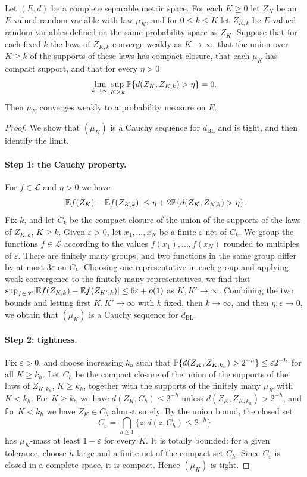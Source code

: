 \begin{lemma}\label{ch25:lem:probability-approximation}
Let $(E,d)$ be a complete separable metric space. For each $K\ge0$ let $Z_K$ be an $E$-valued random variable with law $\mu_K$, and for $0\le k\le K$ let $Z_{K,k}$ be $E$-valued random variables defined on the same probability space as $Z_K$. Suppose that for each fixed $k$ the laws of $Z_{K,k}$ converge weakly as $K\to\infty$, that the union over $K\ge k$ of the supports of these laws has compact closure, that each $\mu_K$ has compact support, and that for every $\eta>0$
\[
 \lim_{k\to\infty}\sup_{K\ge k}\mathbb P\{d(Z_K,Z_{K,k})>\eta\}=0.
\]
Then $\mu_K$ converges weakly to a probability measure on $E$.
\end{lemma}

\begin{proof}
We show that $(\mu_K)$ is a Cauchy sequence for $d_{\mathrm{BL}}$ and is tight, and then identify the limit.

\paragraph{Step 1: the Cauchy property.}
For $f\in\mathscr L$ and $\eta>0$ we have
\[
 \lvert \mathbb E f(Z_K)-\mathbb E f(Z_{K,k})\rvert\le\eta+2\mathbb P\{d(Z_K,Z_{K,k})>\eta\}.
\]
Fix $k$, and let $C_k$ be the compact closure of the union of the supports of the laws of $Z_{K,k}$, $K\ge k$. Given $\varepsilon>0$, let $x_1,\ldots,x_N$ be a finite $\varepsilon$-net of $C_k$. We group the functions $f\in\mathscr L$ according to the values $f(x_1),\ldots,f(x_N)$ rounded to multiples of $\varepsilon$. There are finitely many groups, and two functions in the same group differ by at most $3\varepsilon$ on $C_k$. Choosing one representative in each group and applying weak convergence to the finitely many representatives, we find that $\sup_{f\in\mathscr L}\lvert \mathbb E f(Z_{K,k})-\mathbb E f(Z_{K',k})\rvert\le6\varepsilon+o(1)$ as $K,K'\to\infty$. Combining the two bounds and letting first $K,K'\to\infty$ with $k$ fixed, then $k\to\infty$, and then $\eta,\varepsilon\to0$, we obtain that $(\mu_K)$ is a Cauchy sequence for $d_{\mathrm{BL}}$.

\paragraph{Step 2: tightness.}
Fix $\varepsilon>0$, and choose increasing $k_h$ such that $\mathbb P\{d(Z_K,Z_{K,k_h})>2^{-h}\}\le\varepsilon2^{-h}$ for all $K\ge k_h$. Let $C_h$ be the compact closure of the union of the supports of the laws of $Z_{K,k_h}$, $K\ge k_h$, together with the supports of the finitely many $\mu_K$ with $K<k_h$. For $K\ge k_h$ we have $d(Z_K,C_h)\le2^{-h}$ unless $d(Z_K,Z_{K,k_h})>2^{-h}$, and for $K<k_h$ we have $Z_K\in C_h$ almost surely. By the union bound, the closed set
\[
 C_\varepsilon=\bigcap_{h\ge1}\{z:d(z,C_h)\le2^{-h}\}
\]
has $\mu_K$-mass at least $1-\varepsilon$ for every $K$. It is totally bounded: for a given tolerance, choose $h$ large and a finite net of the compact set $C_h$. Since $C_\varepsilon$ is closed in a complete space, it is compact. Hence $(\mu_K)$ is tight.


\end{proof}
